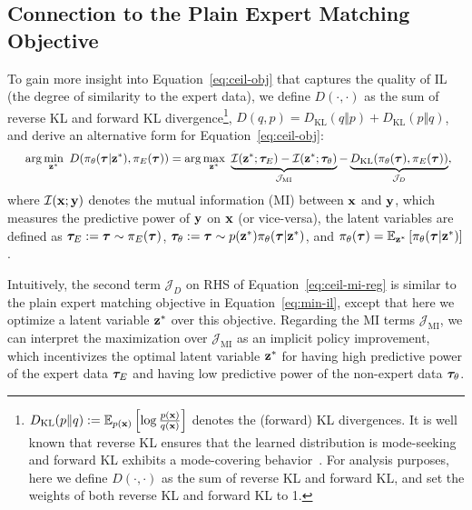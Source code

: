 \subsection{Connection to the Plain Expert Matching Objective}
\label{sec:mutual-info-reg}

To gain more insight into Equation~\ref{eq:ceil-obj} that captures the quality of IL (the degree of similarity to the expert data), we define $D(\cdot, \cdot)$ as the sum of reverse KL and forward KL divergence\footnote{$D_\text{KL}(p\Vert q):=\mathbb{E}_{p(\mathbf{x})}\left[ \log \frac{p(\mathbf{x})}{q(\mathbf{x})} \right]$ denotes the (forward) KL divergences. It is well known that reverse KL ensures that the learned distribution is mode-seeking and forward KL exhibits a mode-covering behavior~\citep{ke2020imitation}. For analysis purposes, here we define $D(\cdot, \cdot)$ as the sum of reverse KL and forward KL, and set the weights of both reverse KL and forward KL to 1.}, \ie $D(q, p) = D_\text{KL}(q\Vert p) + D_\text{KL}(p\Vert q)$, and derive an alternative form for Equation~\ref{eq:ceil-obj}: 
\begin{align}
	&\ \quad \arg \min_{{\mathbf{z}}^*} \ D(\pi_\theta({\bm{\tau}}|{\mathbf{z}}^*), \pi_E({\bm{\tau}})) 
	= \arg \max_{{\mathbf{z}}^*} \ \underbrace{\mathcal{I}({\mathbf{z}}^*; {\bm{\tau}}_E) - \mathcal{I}({\mathbf{z}}^*; {\bm{\tau}}_\theta)}_{\mathcal{J}_\text{MI}}
	- \underbrace{D_\text{KL}(\pi_\theta({\bm{\tau}}), \pi_E({\bm{\tau}}))}_{\mathcal{J}_{D}}, \label{eq:ceil-mi-reg}
\end{align}
where $\mathcal{I}(\mathbf{x};\mathbf{y})$ denotes the mutual information (MI) between $\mathbf{x}$ and $\mathbf{y}$, which measures the predictive power of $\mathbf{y}$ on $\mathbf{x}$ (or vice-versa), 
the latent variables are defined as ${\bm{\tau}}_E:={\bm{\tau}} \sim \pi_E({\bm{\tau}})$, ${\bm{\tau}}_\theta:={\bm{\tau}} \sim p({\mathbf{z}}^*)\pi_\theta({\bm{\tau}}|{\mathbf{z}}^*)$, and $\pi_\theta({\bm{\tau}})=\mathbb{E}_{{\mathbf{z}}^*}\left[ \pi_\theta({\bm{\tau}}|{\mathbf{z}}^*) \right]$. 

Intuitively, the second term $\mathcal{J}_{D}$ on RHS of Equation~\ref{eq:ceil-mi-reg} is similar to the plain expert matching objective in Equation~\ref{eq:min-il}, except that here we optimize a latent variable ${\mathbf{z}}^*$ over this objective. Regarding the MI terms $\mathcal{J}_\text{MI}$, we can interpret the maximization over $\mathcal{J}_\text{MI}$ as an implicit policy improvement, which incentivizes the optimal latent variable ${\mathbf{z}}^*$ for having high predictive power of the expert data ${\bm{\tau}}_E$ and having low predictive power of the non-expert data ${\bm{\tau}}_\theta$. 

